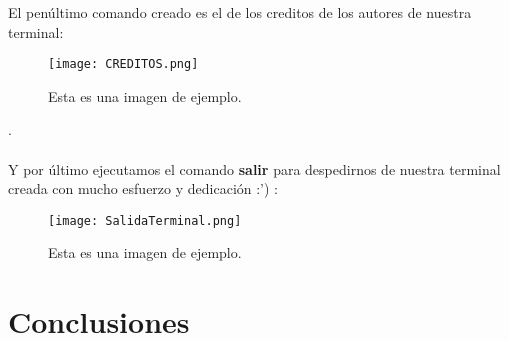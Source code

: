 \documentclass[titlepage]{article}
\begin{document}
El penúltimo comando creado es el de los creditos de los autores de nuestra terminal: 

\begin{figure}[H]
    \centering
    \texttt{[image: CREDITOS.png]}
    \caption{Esta es una imagen de ejemplo.}
    \label{fig:ejemplo}
\end{figure}
.\\\\

Y por último ejecutamos el comando \textbf{salir} para despedirnos de nuestra terminal creada con mucho esfuerzo y dedicación :') :

\begin{figure}[H]
    \centering
    \texttt{[image: SalidaTerminal.png]}
    \caption{Esta es una imagen de ejemplo.}
    \label{fig:ejemplo}
\end{figure}

\section{Conclusiones}
\end{document}
